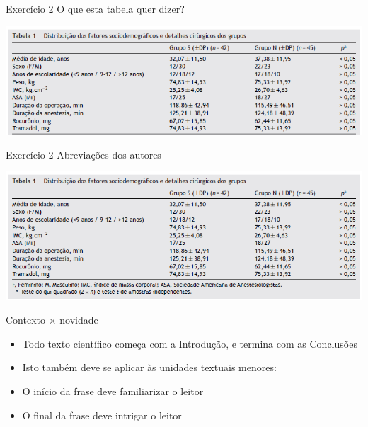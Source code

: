 \documentclass{beamer}
\begin{document}
\begin{frame}{Exercício 2}
  O que esta tabela quer dizer?
  \begin{center}
    \includegraphics[width=1.18\textwidth]{Escrita/exercicio-tabela-1}
  \end{center}
\end{frame}

\begin{frame}{Exercício 2}
  Abreviações dos autores
  \begin{center}
    \includegraphics[width=1.18\textwidth]{Escrita/exercicio-tabela-2}
  \end{center}
\end{frame}

\begin{frame}{Contexto $\times$ novidade}
  \begin{itemize}
    \footnotesize
  \item Todo texto científico começa com a Introdução, e termina com
    as Conclusões
    \medskip
  \item Isto também deve se aplicar às unidades textuais menores:
    \medskip
  \item O início da frase deve familiarizar o leitor
    \medskip
  \item O final da frase deve intrigar o leitor
  \end{itemize}
\end{frame}
\end{document}
